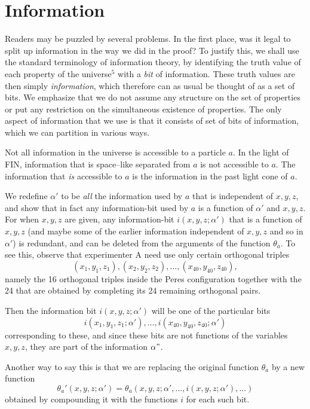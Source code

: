 \documentclass[12pt]{amsart}
\begin{document}
\section {Information}

Readers may be puzzled by several problems.
In the first place, was it legal to split up information in the way we did in the proof? To justify this, we shall use the standard terminology of information theory,
by identifying the truth value of each property of the universe$^5$ with a 
{\it bit} of information. These truth values are then simply {\it information}, which 
therefore can as usual be thought of as a set of bits.  We emphasize that we do not assume any structure on the set of properties or put any restriction on the simultaneous existence 
of properties.  The only aspect of information that we use is that it consists of set of bits of information, which we can partition in various ways.

Not all information in the universe is accessible to a particle $a$.
In the light of FIN, information that is space--like separated from
$a$ is not accessible to $a$.  The information that {\it is} accessible to $a$ is
the information in the past light cone of $a$.

We redefine $\alpha'$ to be {\em all} the information used by $a$ that is independent
of $x,y,z$, and show that in fact any information-bit used by $a$ is a function of $\alpha'$ and $x,y,z$. For when $x,y,z$ are given, any information-bit $i(x,y,z; {\alpha'})$ that is a function of $x,y,z$ (and maybe some of the earlier information  independent of $x,y,z$ and so in $\alpha'$) is redundant, and can be deleted from the arguments of the function  $\theta_a$. To see this, observe that experimenter A need use only certain orthogonal triples $$(x_1,y_1,z_1), (x_2,y_2,z_2),\ldots ,(x_{40},y_{40},z_{40}),$$
namely the 16 orthogonal triples inside the Peres configuration together with the 24
that are obtained by completing its 24 remaining orthogonal pairs.

Then the information bit $i (x,y,z; \alpha')$ will be one
of the particular bits
$$ i(x_1,y_1, z_1; \alpha'), \ldots , i(x_{40} , y_{40}, z_{40} ; \alpha')
$$
corresponding to these, and since these bits are not functions of the
variables $x,y,z$, they are part of the information $\alpha"$.

Another way to say this is that we are replacing the 
original function $\theta_a$ by a new function 
$$
\theta_a'(x,y,z;\alpha') = 
     \theta_a(x,y,z;\alpha',..., i(x,y,z;\alpha'), ...)
$$
obtained by compounding it with the functions $i$ for each such bit.
  
\end{document}
